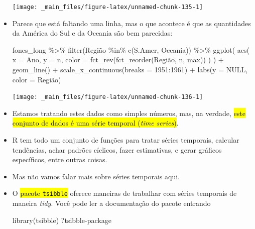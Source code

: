 \documentclass[
  11pt]{report}
\newenvironment{Shaded}{\begin{snugshade}}{\end{snugshade}}
\newcommand{\AttributeTok}[1]{\textcolor[rgb]{0.77,0.63,0.00}{#1}}
\newcommand{\ConstantTok}[1]{\textcolor[rgb]{0.00,0.00,0.00}{#1}}
\newcommand{\DecValTok}[1]{\textcolor[rgb]{0.00,0.00,0.81}{#1}}
\newcommand{\FunctionTok}[1]{\textcolor[rgb]{0.00,0.00,0.00}{#1}}
\newcommand{\NormalTok}[1]{#1}
\newcommand{\SpecialCharTok}[1]{\textcolor[rgb]{0.00,0.00,0.00}{#1}}
\newcommand{\StringTok}[1]{\textcolor[rgb]{0.31,0.60,0.02}{#1}}
\renewenvironment{Shaded}{
    \begin{mdframed}[%
      roundcorner=2pt,%
      innerleftmargin=5pt,%
      innerrightmargin=5pt,%
      topline=true,%
      leftline=true,%
      rightline=true,%
      bottomline=true,%
      linewidth=0.5pt,%
      linecolor=black!20,%
      backgroundcolor=black!2,%
      skipabove=2ex,%
      skipbelow=2.5ex%
    ]%
  }
  {
    \end{mdframed}
  }
\begin{document}
\begin{itemize}
  \begin{center}\texttt{[image: \_main\_files/figure-latex/unnamed-chunk-135-1]} \end{center}
\item
  Parece que está faltando uma linha, mas o que acontece é que as quantidades da América do Sul e da Oceania são bem parecidas:

\begin{Shaded}
\begin{Highlighting}[]
\NormalTok{fones\_long }\SpecialCharTok{\%\textgreater{}\%}
  \FunctionTok{filter}\NormalTok{(Região }\SpecialCharTok{\%in\%} \FunctionTok{c}\NormalTok{(}\StringTok{\textquotesingle{}S.Amer\textquotesingle{}}\NormalTok{, }\StringTok{\textquotesingle{}Oceania\textquotesingle{}}\NormalTok{)) }\SpecialCharTok{\%\textgreater{}\%} 
  \FunctionTok{ggplot}\NormalTok{(}
    \FunctionTok{aes}\NormalTok{(}
      \AttributeTok{x =}\NormalTok{ Ano, }
      \AttributeTok{y =}\NormalTok{ n, }
      \AttributeTok{color =} \FunctionTok{fct\_rev}\NormalTok{(}\FunctionTok{fct\_reorder}\NormalTok{(Região, n, max))}
\NormalTok{    )}
\NormalTok{  ) }\SpecialCharTok{+}
    \FunctionTok{geom\_line}\NormalTok{() }\SpecialCharTok{+}
    \FunctionTok{scale\_x\_continuous}\NormalTok{(}\AttributeTok{breaks =} \DecValTok{1951}\SpecialCharTok{:}\DecValTok{1961}\NormalTok{) }\SpecialCharTok{+}
    \FunctionTok{labs}\NormalTok{(}\AttributeTok{y =} \ConstantTok{NULL}\NormalTok{, }\AttributeTok{color =} \StringTok{\textquotesingle{}Região\textquotesingle{}}\NormalTok{)}
\end{Highlighting}
\end{Shaded}

  \begin{center}\texttt{[image: \_main\_files/figure-latex/unnamed-chunk-136-1]} \end{center}
\item
  Estamos tratando estes dados como simples números, mas, na verdade, {\hl{este conjunto de dados é uma série temporal (\emph{time series})}}.
\item
  R tem todo um conjunto de funções para tratar séries temporais, calcular tendências, achar padrões cíclicos, fazer estimativas, e gerar gráficos específicos, entre outras coisas.
\item
  Mas não vamos falar mais sobre séries temporais aqui.
\item
  O {\hl{pacote {\mbox{\texttt{tsibble}}}}} oferece maneiras de trabalhar com séries temporais de maneira \emph{tidy}. Você pode ler a documentação do pacote entrando

\begin{Shaded}
\begin{Highlighting}[]
\FunctionTok{library}\NormalTok{(tsibble)}
\NormalTok{?}\StringTok{\textasciigrave{}}\AttributeTok{tsibble{-}package}\StringTok{\textasciigrave{}}
\end{Highlighting}
\end{Shaded}
\end{itemize}
\end{document}
